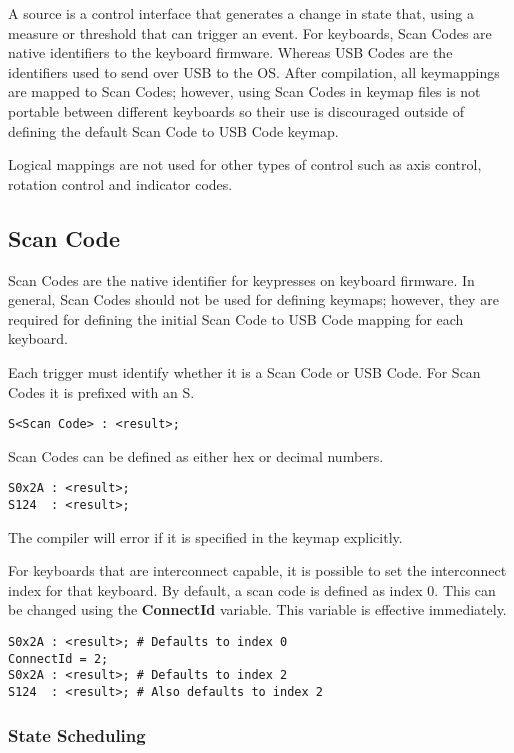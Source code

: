 \documentclass{kiibohd-template}
\begin{document}
A source is a control interface that generates a change in state that, using a measure or threshold that can trigger an event.
For keyboards, Scan Codes are native identifiers to the keyboard firmware.
Whereas USB Codes are the identifiers used to send over USB to the OS.
After compilation, all keymappings are mapped to Scan Codes; however, using Scan Codes in keymap files is not portable between different keyboards so their use is discouraged outside of defining the default Scan Code to USB Code keymap.

Logical mappings are not used for other types of control such as axis control, rotation control and indicator codes.


\subsection{Scan Code}
\label{subsec:Scan_Code}

Scan Codes are the native identifier for keypresses on keyboard firmware.
In general, Scan Codes should not be used for defining keymaps; however, they are required for defining the initial Scan Code to USB Code mapping for each keyboard.

Each trigger must identify whether it is a Scan Code or USB Code.
For Scan Codes it is prefixed with an S.

\begin{lstlisting}
S<Scan Code> : <result>;
\end{lstlisting}

Scan Codes can be defined as either hex or decimal numbers.

\begin{lstlisting}
S0x2A : <result>;
S124  : <result>;
\end{lstlisting}

The compiler will error if it is specified in the keymap explicitly.

For keyboards that are interconnect capable, it is possible to set the interconnect index for that keyboard.
By default, a scan code is defined as index 0.
This can be changed using the \textbf{ConnectId} variable.
This variable is effective immediately.

\begin{lstlisting}
S0x2A : <result>; # Defaults to index 0
ConnectId = 2;
S0x2A : <result>; # Defaults to index 2
S124  : <result>; # Also defaults to index 2
\end{lstlisting}


\subsubsection{State Scheduling}
\label{subsubsec:ScanCodeStateScheduling}
\end{document}
